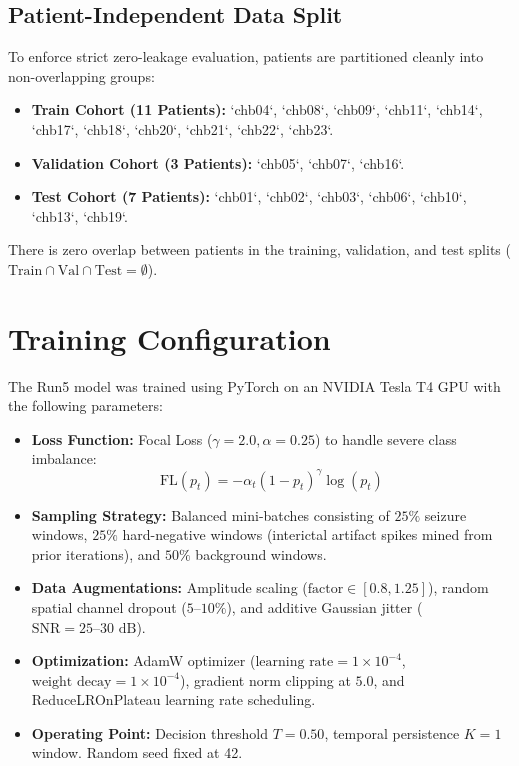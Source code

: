\documentclass[conference]{IEEEtran}
\begin{document}
\subsection{Patient-Independent Data Split}
To enforce strict zero-leakage evaluation, patients are partitioned cleanly into non-overlapping groups:
\begin{itemize}
    \item \textbf{Train Cohort (11 Patients):} `chb04`, `chb08`, `chb09`, `chb11`, `chb14`, `chb17`, `chb18`, `chb20`, `chb21`, `chb22`, `chb23`.
    \item \textbf{Validation Cohort (3 Patients):} `chb05`, `chb07`, `chb16`.
    \item \textbf{Test Cohort (7 Patients):} `chb01`, `chb02`, `chb03`, `chb06`, `chb10`, `chb13`, `chb19`.
\end{itemize}
There is zero overlap between patients in the training, validation, and test splits ($\text{Train} \cap \text{Val} \cap \text{Test} = \emptyset$).

\section{Training Configuration}
The Run5 model was trained using PyTorch on an NVIDIA Tesla T4 GPU with the following parameters:
\begin{itemize}
    \item \textbf{Loss Function:} Focal Loss ($\gamma=2.0, \alpha=0.25$) to handle severe class imbalance:
    \begin{equation}
        \text{FL}(p_t) = -\alpha_t (1 - p_t)^\gamma \log(p_t)
    \end{equation}
    \item \textbf{Sampling Strategy:} Balanced mini-batches consisting of $25\%$ seizure windows, $25\%$ hard-negative windows (interictal artifact spikes mined from prior iterations), and $50\%$ background windows.
    \item \textbf{Data Augmentations:} Amplitude scaling ($\text{factor} \in [0.8, 1.25]$), random spatial channel dropout ($5\text{--}10\%$), and additive Gaussian jitter ($\text{SNR} = 25\text{--}30\text{ dB}$).
    \item \textbf{Optimization:} AdamW optimizer ($\text{learning rate} = 1\times 10^{-4}$, $\text{weight decay} = 1\times 10^{-4}$), gradient norm clipping at $5.0$, and ReduceLROnPlateau learning rate scheduling.
    \item \textbf{Operating Point:} Decision threshold $T=0.50$, temporal persistence $K=1$ window. Random seed fixed at 42.
\end{itemize}
\end{document}
